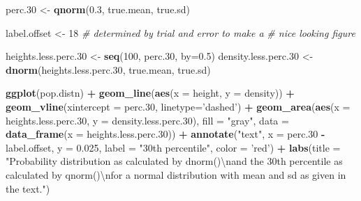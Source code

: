\documentclass[]{book}
\newenvironment{Shaded}{\begin{snugshade}}{\end{snugshade}}
\newcommand{\CharTok}[1]{\textcolor[rgb]{0.31,0.60,0.02}{#1}}
\newcommand{\CommentTok}[1]{\textcolor[rgb]{0.56,0.35,0.01}{\textit{#1}}}
\newcommand{\DataTypeTok}[1]{\textcolor[rgb]{0.13,0.29,0.53}{#1}}
\newcommand{\DecValTok}[1]{\textcolor[rgb]{0.00,0.00,0.81}{#1}}
\newcommand{\FloatTok}[1]{\textcolor[rgb]{0.00,0.00,0.81}{#1}}
\newcommand{\KeywordTok}[1]{\textcolor[rgb]{0.13,0.29,0.53}{\textbf{#1}}}
\newcommand{\NormalTok}[1]{#1}
\newcommand{\OperatorTok}[1]{\textcolor[rgb]{0.81,0.36,0.00}{\textbf{#1}}}
\newcommand{\StringTok}[1]{\textcolor[rgb]{0.31,0.60,0.02}{#1}}
\theoremstyle{definition}
\theoremstyle{definition}
\theoremstyle{definition}
\theoremstyle{remark}
\begin{document}
\begin{Shaded}
\begin{Highlighting}[]
\NormalTok{perc}\FloatTok{.30}\NormalTok{ <-}\StringTok{ }\KeywordTok{qnorm}\NormalTok{(}\FloatTok{0.3}\NormalTok{, true.mean, true.sd)}

\NormalTok{label.offset <-}\StringTok{ }\DecValTok{18} \CommentTok{# determined by trial and error to make a }
                   \CommentTok{# nice looking figure}

\NormalTok{heights.less.perc}\FloatTok{.30}\NormalTok{ <-}\StringTok{ }\KeywordTok{seq}\NormalTok{(}\DecValTok{100}\NormalTok{, perc}\FloatTok{.30}\NormalTok{, }\DataTypeTok{by=}\FloatTok{0.5}\NormalTok{)}
\NormalTok{density.less.perc}\FloatTok{.30}\NormalTok{ <-}\StringTok{ }\KeywordTok{dnorm}\NormalTok{(heights.less.perc}\FloatTok{.30}\NormalTok{, true.mean, true.sd)}

\KeywordTok{ggplot}\NormalTok{(pop.distn) }\OperatorTok{+}
\StringTok{  }\KeywordTok{geom_line}\NormalTok{(}\KeywordTok{aes}\NormalTok{(}\DataTypeTok{x =}\NormalTok{ height, }\DataTypeTok{y =}\NormalTok{ density)) }\OperatorTok{+}\StringTok{ }
\StringTok{  }\KeywordTok{geom_vline}\NormalTok{(}\DataTypeTok{xintercept =}\NormalTok{ perc}\FloatTok{.30}\NormalTok{, }\DataTypeTok{linetype=}\StringTok{'dashed'}\NormalTok{) }\OperatorTok{+}
\StringTok{  }\KeywordTok{geom_area}\NormalTok{(}\KeywordTok{aes}\NormalTok{(}\DataTypeTok{x =}\NormalTok{ heights.less.perc}\FloatTok{.30}\NormalTok{, }\DataTypeTok{y =}\NormalTok{ density.less.perc}\FloatTok{.30}\NormalTok{),}
            \DataTypeTok{fill =} \StringTok{"gray"}\NormalTok{, }\DataTypeTok{data =} \KeywordTok{data_frame}\NormalTok{(}\DataTypeTok{x =}\NormalTok{ heights.less.perc}\FloatTok{.30}\NormalTok{)) }\OperatorTok{+}
\StringTok{  }\KeywordTok{annotate}\NormalTok{(}\StringTok{"text"}\NormalTok{, }\DataTypeTok{x =}\NormalTok{ perc}\FloatTok{.30} \OperatorTok{-}\StringTok{ }\NormalTok{label.offset, }\DataTypeTok{y =} \FloatTok{0.025}\NormalTok{, }
           \DataTypeTok{label =} \StringTok{"30th percentile"}\NormalTok{, }\DataTypeTok{color =} \StringTok{'red'}\NormalTok{) }\OperatorTok{+}
\StringTok{  }\KeywordTok{labs}\NormalTok{(}\DataTypeTok{title =} \StringTok{"Probability distribution as calculated by dnorm()}\CharTok{\textbackslash{}n}\StringTok{and the 30th percentile as calculated by qnorm()}\CharTok{\textbackslash{}n}\StringTok{for a normal distribution with mean and sd as given in the text."}\NormalTok{)}
\end{Highlighting}
\end{Shaded}
\end{document}
